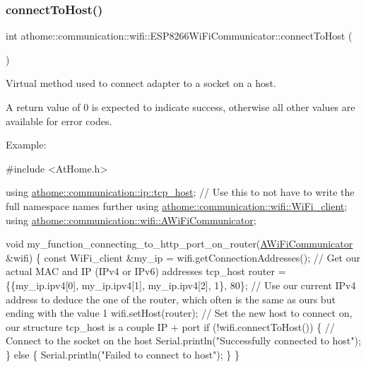 \subsubsection{\texorpdfstring{connect\+To\+Host()}{connectToHost()}}
{\footnotesize\ttfamily int athome\+::communication\+::wifi\+::\+E\+S\+P8266\+Wi\+Fi\+Communicator\+::connect\+To\+Host (\begin{DoxyParamCaption}{ }\end{DoxyParamCaption})\hspace{0.3cm}{\ttfamily [virtual]}}

Virtual method used to connect adapter to a socket on a host.

A return value of 0 is expected to indicate success, otherwise all other values are available for error codes.

Example\+:


\begin{DoxyCode}
\textcolor{preprocessor}{#include <AtHome.h>}

\textcolor{keyword}{using} \mbox{\hyperlink{structathome_1_1communication_1_1ip_1_1s__host}{athome::communication::ip::tcp\_host}}; \textcolor{comment}{// Use this to not have to
       write the full namespace names further}
\textcolor{keyword}{using} \mbox{\hyperlink{structathome_1_1communication_1_1wifi_1_1s__wifi__client}{athome::communication::wifi::WiFi\_client}};
\textcolor{keyword}{using} \mbox{\hyperlink{classathome_1_1communication_1_1wifi_1_1_a_wi_fi_communicator}{athome::communication::wifi::AWiFiCommunicator}};

\textcolor{keywordtype}{void} my\_function\_connecting\_to\_http\_port\_on\_router(\mbox{\hyperlink{classathome_1_1communication_1_1wifi_1_1_a_wi_fi_communicator_a0098148fe8d0eeee99b7f8f72a72a900}{AWiFiCommunicator}} &wifi) \{
  \textcolor{keyword}{const} WiFi\_client &my\_ip = wifi.getConnectionAddresses(); \textcolor{comment}{// Get our actual MAC and IP (IPv4 or IPv6)
       addresses}
  tcp\_host router = \{\{my\_ip.ipv4[0], my\_ip.ipv4[1], my\_ip.ipv4[2], 1\}, 80\}; \textcolor{comment}{// Use our current IPv4 address
       to deduce the one of the router, which often is the same as ours but ending with the value 1}
  wifi.setHost(router); \textcolor{comment}{// Set the new host to connect on, our structure tcp\_host is a couple IP + port}
  \textcolor{keywordflow}{if} (!wifi.connectToHost()) \{ \textcolor{comment}{// Connect to the socket on the host}
    Serial.println(\textcolor{stringliteral}{"Successfully connected to host"});
  \} \textcolor{keywordflow}{else} \{
    Serial.println(\textcolor{stringliteral}{"Failed to connect to host"});
  \}
\}
\end{DoxyCode}
 

